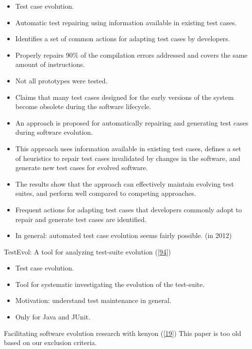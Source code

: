 \documentclass[]{book}
\providecommand{\tightlist}{%
  \setlength{\itemsep}{0pt}\setlength{\parskip}{0pt}}
\begin{document}
\begin{itemize}
\tightlist
\item
  Test case evolution.
\item
  Automatic test repairing using information available in existing test
  cases.
\item
  Identifies a set of common actions for adapting test cases by
  developers.
\item
  Properly repairs 90\% of the compilation errors addressed and covers
  the same amount of instructions.
\item
  Not all prototypes were tested.
\item
  Claims that many test cases designed for the early versions of the
  system become obsolete during the software lifecycle.
\item
  An approach is proposed for automatically repairing and generating
  test cases during software evolution.
\item
  This approach uses information available in existing test cases,
  defines a set of heuristics to repair test cases invalidated by
  changes in the software, and generate new test cases for evolved
  software.
\item
  The results show that the approach can effectively maintain evolving
  test suites, and perform well compared to competing approaches.
\item
  Frequent actions for adapting test cases that developers commonly
  adopt to repair and generate test cases are identified.
\item
  In general: automated test case evolution seems fairly possible. (in
  2012)
\end{itemize}

TestEvol: A tool for analyzing test-suite evolution
({[}\protect\hyperlink{ref-pinto2013}{94}{]})

\begin{itemize}
\tightlist
\item
  Test case evolution.
\item
  Tool for systematic investigating the evolution of the test-suite.
\item
  Motivation: understand test maintenance in general.
\item
  Only for Java and JUnit.
\end{itemize}

Facilitating software evolution research with kenyon
({[}\protect\hyperlink{ref-bevan2005}{19}{]}) This paper is too old
based on our exclusion criteria.
\end{document}
